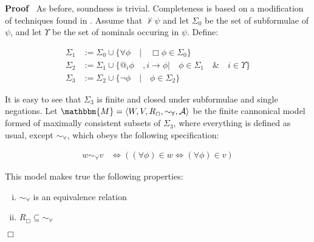 \documentclass{article}
\newcommand{\assign}{:=}
\newenvironment{enumerateroman}{\begin{enumerate}[i.] }{\end{enumerate}}
\newenvironment{proof}{\noindent\textbf{Proof\ }}{\hspace*{\fill}$\Box$\medskip}
\begin{document}
\begin{proof}
  As before, soundness is trivial.  Completeness is based on a modification
  of techniques found in {\cite[chapter 5]{boolos_logic_1995}}.  Assume
  that $\nvdash \psi$ and let $\Sigma_0$ be the set of subformulae of $\psi$,
  and let $\Upsilon$ be the set of nominals occuring in $\psi$.  Define:
  
  \begin{align*}
    {\Sigma}_1 &
    {\assign}{\Sigma}_0{\cup}\{{\forall}{\phi}{\hspace{1em}}|{\hspace{1em}}\Box{\phi}{\in}{\Sigma}_0\}\\
    {\Sigma}_2 &
    {\assign}{\Sigma}_1{\cup}\{\text{@}_i{\phi}{\hspace{1em}},i{\rightarrow}{\phi}|{\hspace{1em}}{\phi}{\in}{\Sigma}_1{\hspace{1em}}\&{\hspace{1em}}i{\in}{\Upsilon}\}\\
    {\Sigma}_3 &
    {\assign}{\Sigma}_2{\cup}\{{\neg}{\phi}{\hspace{1em}}|{\hspace{1em}}{\phi}{\in}{\Sigma}_2\}
  \end{align*}
  
  It is easy to see that $\Sigma_3$ is finite and closed under subformulae and
  single negations. Let $\mathbbm{M}= \langle W, V, R_{\Box}, \sim_{\forall},
  \mathcal{A} \rangle$ be the finite cannonical model formed of maximally
  consistent subsets of $\Sigma_3$, where everything is defined as usual,
  except $\sim_{\forall}$, which obeys the following specification:
  
  \begin{align*}
    w {\sim}_{{\forall}}v & {\Longleftrightarrow}(({\forall}{\phi}){\in}w
    {\Longleftrightarrow}({\forall}{\phi}){\in}v)
  \end{align*}
  
  This model makes true the following properties:
  \begin{enumerateroman}
    \item $\sim_{\forall}$ is an equivalence relation
    
    \item $R_{\Box} \subseteq \sim_{\forall}$
    

\end{enumerateroman}
\end{proof}
\end{document}
